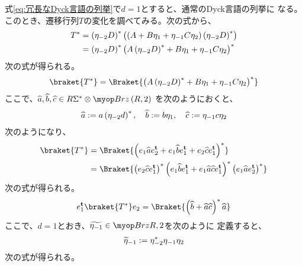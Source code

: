 {	式\eqref{eq:冗長なDyck言語の列挙}で$d=1$とすると、通常のDyck言語の列挙に
	なる。このとき、遷移行列$T$の変化を調べてみる。次の式から、
	\begin{equation*}\begin{split}
		T^* &= \left({\eta_{-2}D}\right)^*
			\bigl({\left({A + B\eta_1 + \eta_{-1}C\eta_2}\right)\left({\eta_{-2}D}\right)^*}\bigr) \\
		&= \left({\eta_{-2}D}\right)^*
			\bigl({A\left({\eta_{-2}D}\right)^* + B\eta_1 + \eta_{-1}C\eta_2}\bigr)^* \\
	\end{split}\end{equation*}
	次の式が得られる。
	\begin{equation*}\begin{split}
		\braket{T^*} 
		= \Braket{\glr{A\lr{\eta_{-2}D}^* + B\eta_1 + \eta_{-1}C\eta_2}^*}
	\end{split}\end{equation*}
	ここで、$\what{a},\what{b},\what{c}\in R\Sigma^*\otimes\Brz\lr{R,2}$
	を次のようにおくと、
	\begin{equation*}\begin{split}
		\widehat{a} := a\left({\eta_{-2}d}\right)^*,\quad \widehat{b} := b\eta_1
		,\quad \widehat{c} := \eta_{-1}c\eta_2
	\end{split}\end{equation*}
	次のようになり、
	\begin{equation*}\begin{split}
		\braket{T^*} &= \Braket{\lr{e_1\what{a}e_2^\tran + e_1\what{b}e_1^\tran
			+ e_2\what{c}e_1^\tran}^*} \\
		&= \Braket{\lr{e_2\what{c}e_1^\tran}^*
			\lr{e_1\what{b}e_1^\tran + e_1\what{a}\what{c}e_1^\tran}^*
			\lr{e_1\what{a}e_2^\tran}^*}
	\end{split}\end{equation*}
	次の式が得られる。
	\begin{equation*}\begin{split}
		e_1^\tran\braket{T^*}e_2 
		= \Braket{\lr{\what{b} + \what{a}\what{c}}^*\what{a}}
	\end{split}\end{equation*}
	ここで、$d=1$とおき、$\wtilde{\eta_{-1}}\in\Brz{R,2}$を次のように
	定義すると、
	\begin{equation*}\begin{split}
		\widetilde{\eta}_{-1} := \eta_{-2}^*\eta_{-1}\eta_2
	\end{split}\end{equation*}
	次の式が得られる。
	\begin{equation*}\begin{split}

\end{split}
\end{equation*}}
